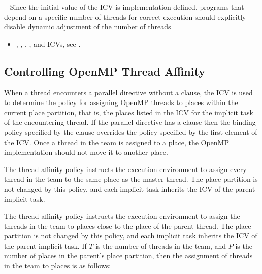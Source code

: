 \notestart
\noteheader – Since the initial value of the  ICV is implementation defined, programs 
that depend on a specific number of threads for correct execution should explicitly 
disable dynamic adjustment of the number of threads
\noteend

\crossreferences
\begin{itemize}
\item {}, , , 
, and  ICVs, see 
.
\end{itemize}










\subsection{Controlling OpenMP Thread Affinity}
\label{subsec:Controlling OpenMP Thread Affinity}

When a thread encounters a parallel directive without a  clause, the  ICV is used to determine the policy for assigning OpenMP threads to places within the current place partition, that is, the places listed in the  ICV for the implicit task of the encountering thread. If the parallel directive has a  clause then the binding policy specified by the  clause overrides the policy specified by the first element of the  ICV. Once a thread in the team is assigned to a place, the OpenMP implementation should not move it to another place. 

The  thread affinity policy instructs the execution environment to assign every thread in the team to the same place as the master thread. The place partition is not changed by this policy, and each implicit task inherits the  ICV of the parent implicit task.

The  thread affinity policy instructs the execution environment to assign the threads in the team to places close to the place of the parent thread. The place partition is not changed by this policy, and each implicit task inherits the  ICV of the parent implicit task. If $T$ is the number of threads in the team, and $P$ is the number of places in the parent's place partition, then the assignment of threads in the team to places is as follows:

